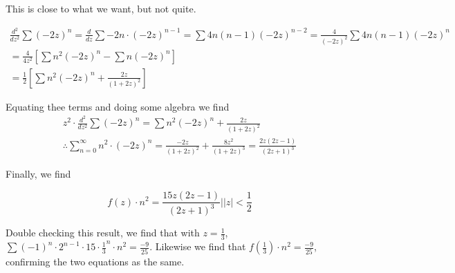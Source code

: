 \documentclass{article}
\begin{document}
This is close to what we want, but not quite.

\begin{align*}
\frac{d^2}{dz^2} \sum (-2z)^n = \frac{d}{dz} \sum -2n \cdot (-2z)^{n-1} = \sum 4n(n-1)(-2z)^{n-2} = \frac{4}{(-2z)^2} \sum 4n(n-1)(-2z)^n\\
= \frac{4}{4z^2} \left[ \sum n^2(-2z)^n - \sum n(-2z)^n\right]\\
= \frac{1}{2} \left[ \sum n^2(-2z)^n + \frac{2z}{(1+2z)^2}\right]
\end{align*}

Equating thee terms and doing some algebra we find
\begin{align*}
z^2 \cdot \frac{d^2}{dz^2} \sum (-2z)^n = \sum n^2(-2z)^n + \frac{2z}{(1+2z)^2}\\
\therefore \sum_{n=0}^{\infty} n^2 \cdot (-2z)^n = \frac{-2z}{(1+2z)^2} + \frac{8z^2}{(1+2z)^3} = \frac{2z(2z-1)}{(2z+1)^3}
\end{align*}

Finally, we find

\[
f(z) \cdot n^2 = \frac{15z(2z-1)}{(2z+1)^3} \Bigr| \left|z\right| < \frac{1}{2}
\]

Double checking this result, we find that with $z = \frac{1}{3}$, $\sum (-1)^n \cdot 2^{n-1} \cdot 15 \cdot \frac{1}{3}^n \cdot n^2 = \frac{-9}{25}$.
Likewise we find that $f(\frac{1}{3}) \cdot n^2 = \frac{-9}{25}$, confirming the two equations as the same.
\end{document}
